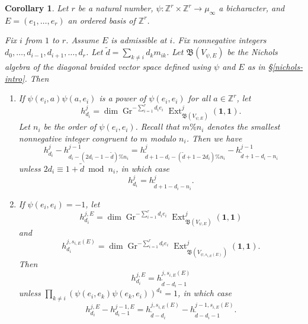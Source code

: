 \documentclass[11pt,letterpaper]{article}
\newtheorem{cor}[theorem]{Corollary}
\theoremstyle{definition}
\theoremstyle{remark}
\numberwithin{equation}{section}
\theoremstyle{dotless}
\newcommand{\Gr}{\operatorname{Gr}}
\newcommand{\hchi}{\psi} %
\renewcommand{\tilde}{\widetilde}
\begin{document}
\begin{cor}\label{nichols-relation-theorem} Let $r$ be a natural number, $\hchi\colon \mathbb Z^r \times \mathbb Z^r \to\mu_\infty$ a bicharacter, and $E=(e_1,\dots,e_r)$ an ordered basis of $\mathbb Z^r$.

Fix $i$ from $1$ to $r$. Assume $E$ is admissible at $i$. Fix nonnegative integers $d_0,\dots, d_{i-1}, d_{i+1},\dots, d_r$. Let $\tilde{d}= \sum_{k \neq i} d_k m_{ik}$. Let $ \mathfrak B( V_{\hchi,E} )$ be the Nichols algebra of the diagonal braided vector space defined using $\hchi$ and $E$ as in \S\ref{nichols-intro}.
Then
\begin{enumerate}
    \item If $\hchi(e_i,a)\hchi(a,e_i)$ is a power of $\hchi(e_i,e_i) $ for all $a\in \mathbb Z^r$, let
    \[ h^j_{d_i} =  \dim \Gr^{ -\sum_{i=1}^r d_i e_i}  \operatorname{Ext}^{j } _{ \mathfrak B( V_{\hchi,E} )} (\mathbf 1, \mathbf 1) .\]
Let $n_i$ be the order of $\hchi(e_i,e_i)$. Recall that $m \% n_i$ denotes the smallest nonnegative integer congruent to $m$ modulo $n_i$.  Then we have 
\begin{equation}\label{nichols-kubota-general} h^j_{d_i} - h^{j-1}_{d_i - (2d_i-1-\tilde{d})\%n_i} = h^{j}_{\tilde{d}+1-d_i - (\tilde{d}+1-2d_i)\% n_i} - h^{j-1}_{\tilde{d}+1-d_i-n_i} \end{equation}
    unless $2d_i \equiv 1 + \tilde{d}\bmod n_i$, in which case 
    \begin{equation}\label{nichols-kubota-special} h^j_{d_i} = h^j_{\tilde{d}+1-d_i-n_i}.\end{equation}

    
    \item If $\hchi(e_i,e_i)=-1$, let 
    \[ h^{j,E}_{d_i} = \dim \Gr^{ -\sum_{i=1}^r d_i e_i}  \operatorname{Ext}^{j } _{ \mathfrak B( V_{\hchi,E} )} (\mathbf 1, \mathbf 1) \] and
        \[ h^{j, s_{i,E}(E)}_{d_i}= \dim \Gr^{ -\sum_{i=1}^r d_i e_i}  \operatorname{Ext}^{j } _{ \mathfrak B( V_{\hchi,s_{i,E}(E) } )} (\mathbf 1, \mathbf 1) .\] 
Then
    \begin{equation}\label{nichols-dirichlet-general} h^{j,E}_{d_i}= h^{j,s_{i,E}(E)}_{\tilde{d}-d_i-1} \end{equation} unless $\prod_{k\neq i}( \hchi(e_i,e_k) \hchi(e_k,e_i))^{d_k}=1$, in which case
\begin{equation}\label{nichols-dirichlet-special} h^{j,E}_{d_i}- h^{j-1,E}_{d_i-1} = h^{j,s_{i,E}(E)}_{\tilde{d}-d_i} - h^{j-1,s_{i,E}(E)}_{\tilde{d}-d_i-1}  .\end{equation}
    
\end{enumerate}


\end{cor}
\end{document}
